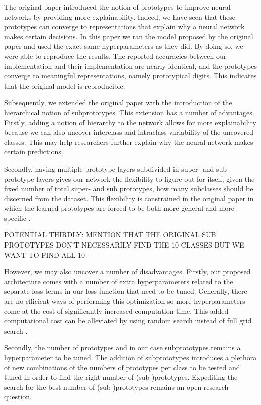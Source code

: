The original paper \cite{li2018deep} introduced the notion of prototypes to improve neural networks by providing more explainability. Indeed, we have seen that these prototypes can converge to representations that explain why a neural network makes certain decisions. In this paper we ran the model proposed by the original paper and used the exact same hyperparameters as they did. By doing so, we were able to reproduce the results. The reported accuracies between our implementation and their implementation are nearly identical, and the prototypes converge to meaningful representations, namely prototypical digits. This indicates that the original model is reproducible. 

Subsequently, we extended the original paper with the introduction of the hierarchical notion of subprototypes. This extension has a number of advantages. Firstly, adding a notion of hierarchy to the network allows for more explainability because we can also uncover interclass and intraclass variability of the uncovered classes. This may help researchers further explain why the neural network makes certain predictions.

Secondly, having multiple prototype layers subdivided in super- and sub prototype layers gives our network the flexibility to figure out for itself, given the fixed number of total super- and sub prototypes, how many subclasses should be discerned from the dataset. This flexibility is constrained in the original paper in which the learned prototypes are forced to be both more general and more specific \cite{li2018deep}. 

POTENTIAL THIRDLY: MENTION THAT THE ORIGINAL SUB PROTOTYPES DON'T NECESSARILY FIND THE 10 CLASSES BUT WE WANT TO FIND ALL 10

However, we may also uncover a number of disadvantages. Firstly, our proposed architecture comes with a number of extra hyperparameters related to the separate loss terms in our loss function that need to be tuned. Generally, there are no efficient ways of performing this optimization \cite{paramoptimization} so more hyperparameters come at the cost of significantly increased computation time. This added computational cost can be alleviated by using random search instead of full grid search \cite{paramoptimization}.

Secondly, the number of prototypes and in our case subprototypes remains a hyperparameter to be tuned. The addition of subprototypes introduces a plethora of new combinations of the numbers of prototypes per class to be tested and tuned in order to find the right number of (sub-)prototypes. Expediting the search for the best number of (sub-)prototypes remains an open research question.

